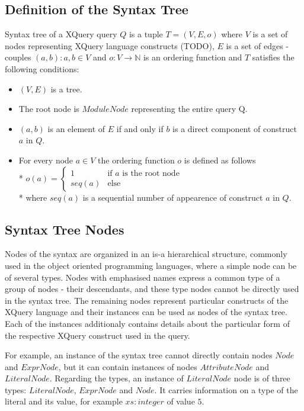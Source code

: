 \subsection{Definition of the Syntax Tree}
\begin{definition}
Syntax tree of a XQuery query $Q$ is a tuple $T = (V, E, o)$ where $V$ is a set of nodes representing XQuery language constructs (TODO), $E$ is a set of edges - couples $(a,b):a,b \in V$ and $o:V \rightarrow \mathbb{N}$ is an ordering function and $T$ satisfies the following conditions:
\begin{itemize}
\item $(V,E)$ is a tree.
\item The root node is $ModuleNode$ representing the entire query Q.
\item $(a,b)$ is an element of $E$ if and only if $b$ is a direct component of construct $a$ in $Q$.
\item For every node $a \in V$ the ordering function $o$ is defined as follows \\* $o(a) = \left\{
	\begin{array}{ll}
		1  & \mbox{if }a\mbox{ is the root node} \\
		seq(a) & \mbox{else}
	\end{array}
\right.$ \\* where $seq(a)$ is a sequential number of appearence of construct $a$ in $Q$.
\end{itemize}
\end{definition}

\subsection{Syntax Tree Nodes}
Nodes of the syntax are organized in an is-a hierarchical structure, commonly used in the object oriented programming languages, where a simple node can be of several types. Nodes with emphasised names express a common type of a group of nodes - their descendants, and these type nodes cannot be directly used in the syntax tree. The remaining nodes represent particular constructs of the XQuery language and their instances can be used as nodes of the syntax tree. Each of the instances additionaly contains details about the particular form of the respective XQuery construct used in the query.


For example, an instance of the syntax tree cannot directly contain nodes $Node$ and $ExprNode$, but it can contain instances of nodes $AttributeNode$ and $LiteralNode$. Regarding the types, an instance of $LiteralNode$ node is of three types: $LiteralNode$, $ExprNode$ and $Node$. It carries information on a type of the literal and its value, for example $xs:integer$ of value $5$.

